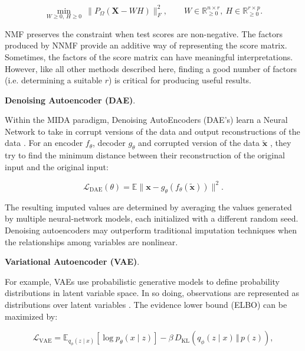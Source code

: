 \begin{equation}\label{eq:nmf}
\min_{W\ge0,\,H\ge0}\ \bigl\lVert P_\Omega(\mathbf{X}-WH)\bigr\rVert_F^2,\qquad W\in\mathbb{R}^{n\times r}_{\ge0},\ H\in\mathbb{R}^{r\times p}_{\ge0}.
\end{equation}

NMF preserves the constraint when test scores are non-negative. The factors produced by NNMF provide an additive way of representing the score matrix. Sometimes, the factors of the score matrix can have meaningful interpretations. However, like all other methods described here, finding a good number of factors (i.e. determining a suitable \(r\)) is critical for producing useful results.

\par\medskip
\noindent\textbf{Denoising Autoencoder (DAE)}.\par\nobreak

Within the MIDA paradigm, Denoising AutoEncoders (DAE's) learn a Neural Network to take in corrupt versions of the data and output reconstructions of the data \parencite{gondara2018mida}. For an encoder $f_\theta$, decoder $g_\theta$ and corrupted version of the data $\tilde{\mathbf{x}}$ , they try to find the minimum distance between their reconstruction of the original input and the original input:

\begin{equation}\label{eq:dae}
\mathcal{L}_{\mathrm{DAE}}(\theta)=\mathbb{E}\bigl\lVert\mathbf{x}-g_\theta\!\left(f_\theta(\tilde{\mathbf{x}})\right)\bigr\rVert^2.
\end{equation}

The resulting imputed values are determined by averaging the values generated by multiple neural-network models, each initialized with a different random seed. Denoising autoencoders may outperform traditional imputation techniques when the relationships among variables are nonlinear.

\par\medskip
\noindent\textbf{Variational Autoencoder (VAE)}.\par\nobreak

For example, VAEs use probabilistic generative models to define probability distributions in latent variable space. In so doing, observations are represented as distributions over latent variables \parencite{kingma2014auto, mccoy2018variational}. The evidence lower bound (ELBO) can be maximized by:

\begin{equation}\label{eq:vae}
\mathcal{L}_{\mathrm{VAE}}=\mathbb{E}_{q_\phi(z\mid x)}\!\left[\log p_\theta(x\mid z)\right]-\beta\,D_{\mathrm{KL}}\!\left(q_\phi(z\mid x)\,\big\Vert\,p(z)\right),
\end{equation}

